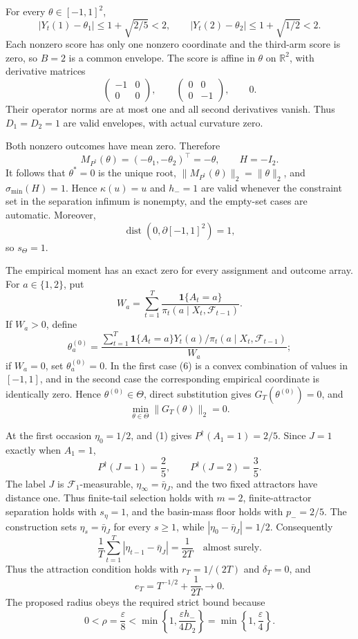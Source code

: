 For every \(\theta\in[-1,1]^2\),
\[
 |Y_t(1)-\theta_1|\le1+\sqrt{2/5}<2,
 \qquad |Y_t(2)-\theta_2|\le1+\sqrt{1/2}<2.
\tag{3}
\]
Each nonzero score has only one nonzero coordinate and the third-arm score is zero, so \(B=2\) is a common envelope. The score is affine in \(\theta\) on \(\mathbb R^2\), with derivative matrices
\[
 \begin{pmatrix}-1&0\\0&0\end{pmatrix},\qquad
 \begin{pmatrix}0&0\\0&-1\end{pmatrix},\qquad 0.
\]
Their operator norms are at most one and all second derivatives vanish. Thus \(D_1=D_2=1\) are valid envelopes, with actual curvature zero.

Both nonzero outcomes have mean zero. Therefore
\[
 M_{P^{\dagger}}(\theta)=(-\theta_1,-\theta_2)^\top=-\theta,
 \qquad H=-I_2.
\tag{4}
\]
It follows that \(\theta^*=0\) is the unique root, \(\|M_{P^{\dagger}}(\theta)\|_2=\|\theta\|_2\), and \(\sigma_{\min}(H)=1\). Hence \(\kappa(u)=u\) and \(h_-=1\) are valid whenever the constraint set in the separation infimum is nonempty, and the empty-set cases are automatic. Moreover,
\[
 \operatorname{dist}(0,\partial[-1,1]^2)=1,
\tag{5}
\]
so \(s_\Theta=1\).

The empirical moment has an exact zero for every assignment and outcome array. For \(a\in\{1,2\}\), put
\[
 W_a=\sum_{t=1}^T\frac{\mathbf1\{A_t=a\}}
 {\pi_t(a\mid X_t,\mathcal F_{t-1})}.
\]
If \(W_a>0\), define
\[
 \theta_a^{(0)}=
 \frac{\sum_{t=1}^T\mathbf1\{A_t=a\}Y_t(a)/
 \pi_t(a\mid X_t,\mathcal F_{t-1})}{W_a};
\tag{6}
\]
if \(W_a=0\), set \(\theta_a^{(0)}=0\). In the first case (6) is a convex combination of values in \([-1,1]\), and in the second case the corresponding empirical coordinate is identically zero. Hence \(\theta^{(0)}\in\Theta\), direct substitution gives \(G_T(\theta^{(0)})=0\), and
\[
 \min_{\theta\in\Theta}\|G_T(\theta)\|_2=0.
\tag{7}
\]

At the first occasion \(\eta_0=1/2\), and (1) gives \(P^{\dagger}(A_1=1)=2/5\). Since \(J=1\) exactly when \(A_1=1\),
\[
 P^{\dagger}(J=1)=\frac25,
 \qquad P^{\dagger}(J=2)=\frac35.
\tag{8}
\]
The label \(J\) is \(\mathcal F_1\)-measurable, \(\eta_\infty=\bar\eta_J\), and the two fixed attractors have distance one. Thus finite-tail selection holds with \(m=2\), finite-attractor separation holds with \(s_\eta=1\), and the basin-mass floor holds with \(p_-=2/5\). The construction sets \(\eta_s=\bar\eta_J\) for every \(s\ge1\), while \(|\eta_0-\bar\eta_J|=1/2\). Consequently
\[
 \frac1T\sum_{t=1}^T|\eta_{t-1}-\bar\eta_J|=\frac1{2T}
 \quad\text{almost surely}.
\tag{9}
\]
Thus the attraction condition holds with \(r_T=1/(2T)\) and \(\delta_T=0\), and
\[
 e_T=T^{-1/2}+\frac1{2T}\longrightarrow0.
\tag{10}
\]
The proposed radius obeys the required strict bound because
\[
 0<\rho=\frac\varepsilon8
 <\min\left\{1,\frac{\varepsilon h_-}{4D_2}\right\}
 =\min\left\{1,\frac\varepsilon4\right\}.
\tag{11}
\]

